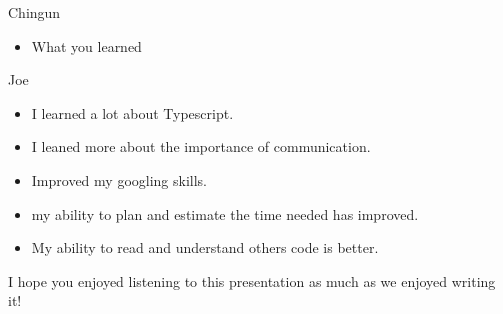 \documentclass{beamer}
\begin{document}
\begin{frame}{Chingun}
    \begin{itemize}
        \item What you learned
    \end{itemize}
\end{frame}

\begin{frame}{Joe}
    \begin{itemize}
	\item I learned a lot about Typescript.
    	\item I leaned more about the importance of communication.
    	\item Improved my googling skills.
   	\item my ability to plan and estimate the time needed has improved.
    	\item My ability to read and understand others code is better.
    \end{itemize}
\end{frame}

\begin{frame}
  \begin{center}
    \Huge{I hope you enjoyed listening to this presentation as much as we enjoyed writing it!}
  \end{center}
\end{frame}
\end{document}
